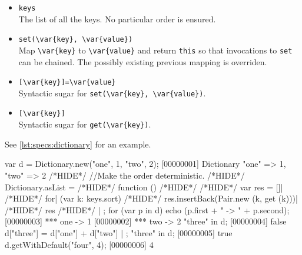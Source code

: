 \begin{itemize}
\item \lstinline|keys|\\
  The list of all the keys.  No particular order is ensured.

\item \lstinline|set(\var{key}, \var{value})|\\
  Map \lstinline|\var{key}| to \lstinline|\var{value}| and return
  \lstinline|this| so that invocations to \lstinline|set| can be
  chained.  The possibly existing previous mapping is overriden.

\item \lstinline|[\var{key}]=\var{value}|\\
  Syntactic sugar for \lstinline|set(\var{key}, \var{value})|.

\item \lstinline|[\var{key}]|\\
  Syntactic sugar for \lstinline|get(\var{key})|.
\end{itemize}

See \autoref{lst:specs:dictionary} for an example.

\begin{urbiscript}[caption=Dictionaries, label=lst:specs:dictionary]
var d = Dictionary.new("one", 1, "two", 2);
[00000001] Dictionary {"one" => 1, "two" => 2}
/*HIDE*/ //Make the order deterministic.
/*HIDE*/ Dictionary.asList =
/*HIDE*/ function ()
/*HIDE*/ {
/*HIDE*/   var res = []|
/*HIDE*/   for| (var k: keys.sort)
/*HIDE*/     res.insertBack(Pair.new (k, get (k)))|
/*HIDE*/   res
/*HIDE*/ } | {};
for (var p in d)
  echo (p.first + " -> " + p.second);
[00000003] *** one -> 1
[00000002] *** two -> 2
"three" in d;
[00000004] false
d["three"] = d["one"] + d["two"] | {};
"three" in d;
[00000005] true
d.getWithDefault("four", 4);
[00000006] 4
\end{urbiscript}

